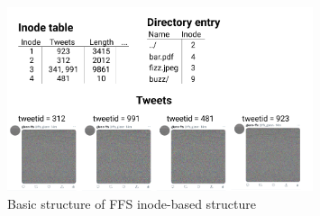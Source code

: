 \begin{figure}[!ht]
	\begin{center}
	  \includegraphics[width=0.8\textwidth]{figures/ffs_inode_diagram.png}
	\end{center}
	\caption{Basic structure of FFS inode-based structure}
	\label{fig:ffs_inode_diag}
\end{figure}